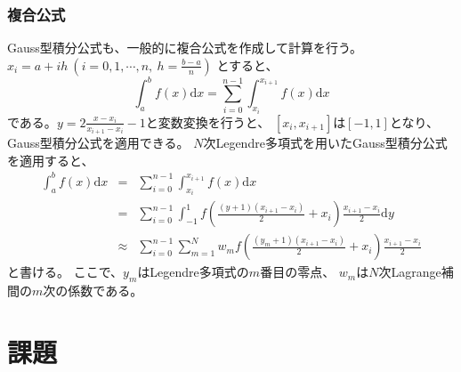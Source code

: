 \documentclass[a4j, titlepage]{jsarticle}
\numberwithin{equation}{section}
\begin{document}
        \subsubsection{複合公式}
            Gauss型積分公式も、一般的に複合公式を作成して計算を行う。
            $x_i=a+ih \ \left(i=0,1,\cdots,n, \ \displaystyle h=\frac{b-a}{n}\right)$
            とすると、
            \begin{equation*}
                \int_a^bf(x)\mathrm{d}x=\sum_{i=0}^{n-1}\int_{x_i}^{x_{i+1}}f(x)\mathrm{d}x
            \end{equation*}
            である。$\displaystyle y = 2\frac{x-x_i}{x_{i+1}-x_i}-1$と変数変換を行うと、
            $[x_i,x_{i+1}]$は$[-1,1]$となり、Gauss型積分公式を適用できる。
            $N$次Legendre多項式を用いたGauss型積分公式を適用すると、
            \begin{eqnarray}
                \int_a^bf(x)\mathrm{d}x &=& \sum_{i=0}^{n-1}\int_{x_i}^{x_{i+1}}f(x)\mathrm{d}x \\
                &=& \sum_{i=0}^{n-1}\int_{-1}^{1}f\left(\frac{(y+1)(x_{i+1}-x_i)}{2}+x_i\right)\frac{x_{i+1}-x_i}{2}\mathrm{d}y \\
                &\approx& \sum_{i=0}^{n-1}\sum_{m=1}^{N}w_mf\left(\frac{(y_m+1)(x_{i+1}-x_i)}{2}+x_i\right)\frac{x_{i+1}-x_i}{2}
            \end{eqnarray}
            と書ける。
            ここで、$y_m$はLegendre多項式の$m$番目の零点、
            $w_m$は$N$次Lagrange補間の$m$次の係数である。

\section{課題}
    

\newpage
{}
\begin{thebibliography}{99}
\end{thebibliography}
\end{document}
